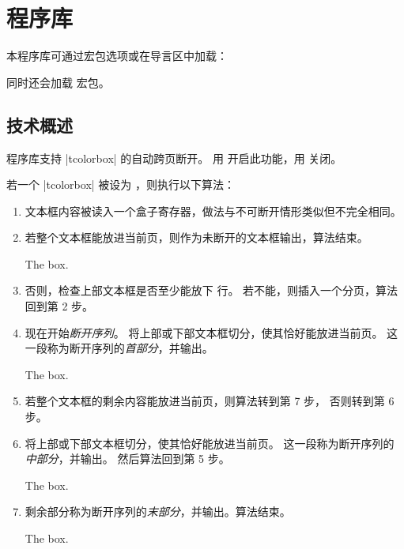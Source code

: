 \clearpage
\section{ 程序库}\label{sec:breakable}%
%
本程序库可通过宏包选项或在导言区中加载：
\begin{dispListing}
\end{dispListing}
同时还会加载  宏包。

\subsection{技术概述}
 程序库支持 |tcolorbox| 的自动跨页断开。
用  开启此功能，用  关闭。

{
若一个 |tcolorbox| 被设为 ，则执行以下算法：
\begin{enumerate}
\item 文本框内容被读入一个盒子寄存器，做法与不可断开情形类似但不完全相同。
\item 若整个文本框能放进当前页，则作为未断开的文本框输出，算法结束。
  \begin{tcolorbox}[title=Unbroken Box,watermark text=unbroken]
  The box.
  \end{tcolorbox}
\item 否则，检查上部文本框是否至少能放下  行。
  若不能，则插入一个分页，算法回到第 2 步。
\item 现在开始\emph{断开序列}。
  将上部或下部文本框切分，使其恰好能放进当前页。
  这一段称为断开序列的\emph{首部分}，并输出。
  \begin{tcolorbox}[title=Broken Box,watermark text=first,skin=enhancedfirst]
  The box.
  \end{tcolorbox}
\item
  若整个文本框的剩余内容能放进当前页，则算法转到第 7 步，
  否则转到第 6 步。
\item
  将上部或下部文本框切分，使其恰好能放进当前页。
  这一段称为断开序列的\emph{中部分}，并输出。
  然后算法回到第 5 步。
  \begin{tcolorbox}[watermark text=middle,skin=enhancedmiddle]
  The box.
  \end{tcolorbox}
\item
  剩余部分称为断开序列的\emph{末部分}，并输出。算法结束。
  \begin{tcolorbox}[watermark text=last,skin=enhancedlast]
  The box.
  \end{tcolorbox}
\end{enumerate}
}

